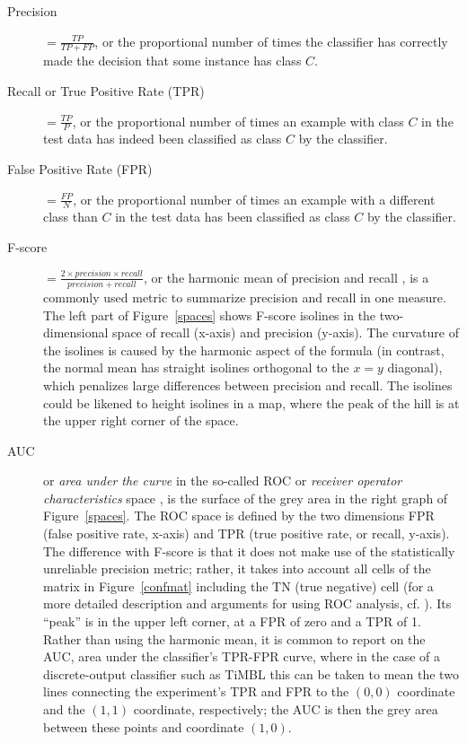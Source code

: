 \documentclass{book}
\begin{document}
\begin{description}
\item[Precision] $= \frac{TP}{TP+FP}$, or the
  proportional number of times the classifier has correctly made the
  decision that some instance has class $C$. 

\item[Recall or True Positive Rate
  (TPR)] $=
  \frac{TP}{P}$, or the proportional number of times an example with
  class $C$ in the test data has indeed been classified as class $C$
  by the classifier. 

\item[False Positive Rate (FPR)] $=
  \frac{FP}{N}$, or the proportional number of times an example with a
  different class than $C$ in the test data has been classified as
  class $C$ by the classifier.

\item[F-score] $= \frac{2 \times precision \times
  recall}{precision + recall}$, or the harmonic mean of precision and recall \cite{VanRijsbergen79}, is a commonly
  used metric to summarize precision and recall in one measure. The
  left part of Figure~\ref{spaces} shows F-score isolines in the
  two-dimensional space of recall (x-axis) and precision (y-axis). The
  curvature of the isolines is caused by the harmonic aspect of the
  formula (in contrast, the normal mean has straight isolines
  orthogonal to the $x=y$ diagonal), which penalizes large differences
  between precision and recall. The isolines could be likened to
  height isolines in a map, where the peak of the hill is at the upper
  right corner of the space.

\item [AUC] or {\em area under
  the curve}\/ in the so-called ROC or {\em receiver
  operator characteristics}\/
  space \cite{Egan75,Swets+00}, is the surface of the grey area in the
  right graph of Figure~\ref{spaces}. The ROC space is defined by the
  two dimensions FPR (false positive rate, x-axis) and TPR (true
  positive rate, or recall, y-axis). The difference with F-score is
  that it does not make use of the statistically unreliable precision
  metric; rather, it takes into account all cells of the matrix in
  Figure~\ref{confmat} including the TN (true negative) cell (for a
  more detailed description and arguments for using ROC analysis,
  cf. \cite{Fawcett04}). Its ``peak'' is in the upper left corner,
  at a FPR of zero and a TPR of 1. Rather than using the harmonic
  mean, it is common to report on the AUC, area under the classifier's
  TPR-FPR curve, where in the case of a discrete-output classifier
  such as {\sc TiMBL} this can be taken to mean the two lines
  connecting the experiment's TPR and FPR to the $(0,0)$ coordinate
  and the $(1,1)$ coordinate, respectively; the AUC is then the grey
  area between these points and coordinate $(1,0)$.

\end{description}
\end{document}

